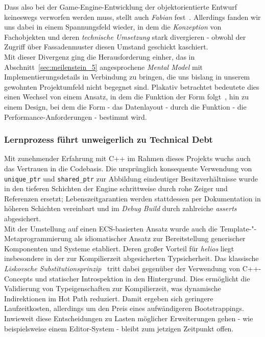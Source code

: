 Dass also bei der Game-Engine-Entwicklung der objektorientierte Entwurf keineswegs verworfen werden muss, stellt auch \textit{Fabian} fest~\cite[S. 239-244]{Fab18}.
Allerdings fanden wir uns dabei in einem Spannungsfeld wieder, in dem die \textit{Konzeption} von Fachobjekten und deren \textit{technische Umsetzung} stark divergieren - obwohl der Zugriff über Fassadenmuster diesen Umstand geschickt kaschiert.\\

Mit dieser Divergenz ging die Herausforderung einher, das in Abschnitt~\ref{sec:meilenstein_5} angesprochene \textit{Mental Model} mit Implementierungsdetails in Verbindung zu bringen, die uns bislang in unserem gewohnten Projektumfeld nicht begegnet sind.
Plakativ betrachtet bedeutete dies einen Wechsel von einem Ansatz, in dem die Funktion der Form folgt~\cite{TD01}, hin zu einem Design, bei dem die Form - das Datenlayout - durch die Funktion - die Performance-Anforderungen - bestimmt wird.

\subsubsection{Lernprozess führt unweigerlich zu Technical Debt}
Mit zunehmender Erfahrung mit C++ im Rahmen dieses Projekts wuchs auch das Vertrauen in die Codebasis.
Die ursprünglich konsequente Verwendung von \texttt{unique\_ptr} und \texttt{shared\_ptr} zur Abbildung eindeutiger Besitzverhältnisse wurde in den tieferen Schichten der Engine schrittweise durch rohe Zeiger und Referenzen ersetzt; Lebenszeitgarantien werden stattdessen per Dokumentation in höheren Schichten vereinbart und im \textit{Debug Build} durch zahlreiche \textit{asserts} abgesichert.\\

Mit der Umstellung auf einen ECS-basierten Ansatz wurde auch die Template-"-Meta\-pro\-gram\-mie\-rung als idiomatischer Ansatz zur Bereitstellung generischer Komponenten und Systeme etabliert.
Deren großer Vorteil für \textit{helios} liegt insbesondere in der zur Kompilierzeit abgesicherten Typsicherheit.
Das klassische \textit{Liskovsche Substitutionsprinzip}~\cite[S. 148]{LG01} tritt dabei gegenüber der Verwendung von C++-Concepts und statischer Introspektion in den Hintergrund.
Dies ermöglicht die Validierung von Typeigenschaften zur Kompilierzeit, was dynamische Indirektionen im Hot Path reduziert.
Damit ergeben sich geringere Laufzeitkosten, allerdings um den Preis eines aufwändigeren Bootstrappings.
Inwieweit diese Entscheidungen zu Lasten möglicher Erweiterungen gehen - wie beispielsweise einem Editor-System - bleibt zum jetzigen Zeitpunkt offen.\\

